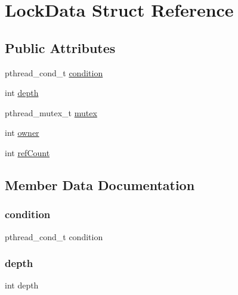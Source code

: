 \hypertarget{structLockData}{}\section{Lock\+Data Struct Reference}
\label{structLockData}
\subsection*{Public Attributes}
\begin{DoxyCompactItemize}
\item 
pthread\+\_\+cond\+\_\+t \mbox{\hyperlink{structLockData_a2d017047068ee847b500c14427ac4d6b}{condition}}
\item 
int \mbox{\hyperlink{structLockData_acb5ba97551079e0b072c62c21d784ac5}{depth}}
\item 
pthread\+\_\+mutex\+\_\+t \mbox{\hyperlink{structLockData_a4acff8232e4aec9cd5c6dc200ac55ef3}{mutex}}
\item 
int \mbox{\hyperlink{structLockData_aa695a8c4a65e8e7c5b752e3e846a44a9}{owner}}
\item 
int \mbox{\hyperlink{structLockData_a43ab0d8eafd71383b2233bdee65911de}{ref\+Count}}
\end{DoxyCompactItemize}


\subsection{Member Data Documentation}
\mbox{\label{structLockData_a2d017047068ee847b500c14427ac4d6b}} 
\subsubsection{\texorpdfstring{condition}{condition}}
{\footnotesize\ttfamily pthread\+\_\+cond\+\_\+t condition}

\mbox{\label{structLockData_acb5ba97551079e0b072c62c21d784ac5}} 
\subsubsection{\texorpdfstring{depth}{depth}}
{\footnotesize\ttfamily int depth}

\mbox{\label{structLockData_a4acff8232e4aec9cd5c6dc200ac55ef3}} 
